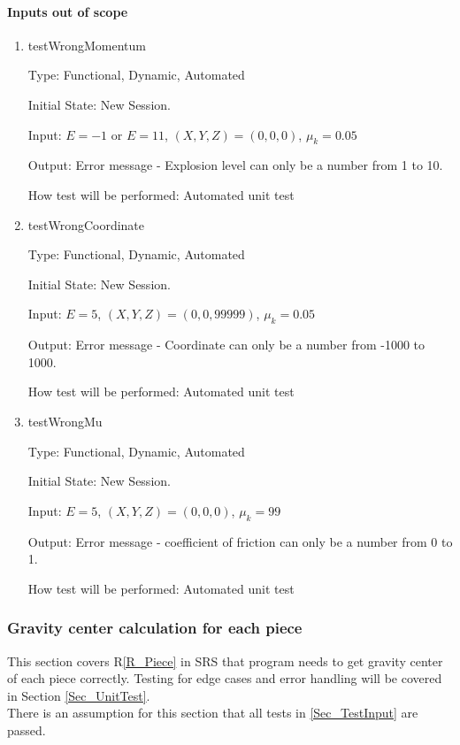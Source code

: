 \documentclass[12pt, titlepage]{article}
\newcommand{\rref}[1]{R\ref{#1}}
\begin{document}
\paragraph{Inputs out of scope}

\begin{enumerate}

\item{testWrongMomentum\\}

Type: Functional, Dynamic, Automated

Initial State: New Session.

Input: $E = -1$ or $E = 11$, $(X,Y,Z) = (0,0,0)$, $\mu_{k} = 0.05$  

Output: Error message - Explosion level can only be a number from 1 to 10.

How test will be performed: Automated unit test

\item{testWrongCoordinate\\}

Type: Functional, Dynamic, Automated

Initial State: New Session.

Input: $E = 5$, $(X,Y,Z) = (0,0,99999)$, $\mu_{k} = 0.05$  

Output: Error message - Coordinate can only be a number from -1000 to 1000.

How test will be performed: Automated unit test

\item{testWrongMu\\}

Type: Functional, Dynamic, Automated

Initial State: New Session.

Input: $E = 5$, $(X,Y,Z) = (0,0,0)$, $\mu_{k} = 99$  

Output: Error message - coefficient of friction can only be a number from 0 to 1.

How test will be performed: Automated unit test 

\end{enumerate}

\subsubsection{Gravity center calculation for each piece}
\label{Sec_testGravityCenter}

This section covers \rref{R_Piece} in SRS that program needs to get gravity center of each piece correctly. Testing for edge cases and error handling will be covered in Section \ref{Sec_UnitTest}. \\
There is an assumption for this section that all tests in \ref{Sec_TestInput} are passed.
\end{document}
